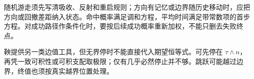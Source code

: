 随机游走须先写清吸收、反射和重启规则；方向有记忆或边界随历史移动时，应把方向或回撤差距纳入状态。命中概率满足调和方程，平均时间满足带常数项的首步方程。对成功路径作条件化时，要按后续成功概率重新加权，不能只删去失败终点。

鞅提供另一类边值工具，但无界停时不能直接代入期望恒等式。可先停在 $\tau\wedge n$，再凭一致可积性或可积支配取极限；仅有几乎必然停止并不够。跳跃可能越过边界，终值也须按真实越界位置处理。
\par\smallskip

